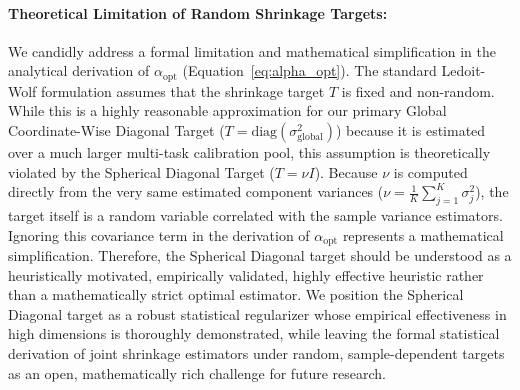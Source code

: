 \paragraph{Theoretical Limitation of Random Shrinkage Targets:} We candidly address a formal limitation and mathematical simplification in the analytical derivation of $\alpha_{\text{opt}}$ (Equation~\ref{eq:alpha_opt}). The standard Ledoit-Wolf formulation assumes that the shrinkage target $T$ is fixed and non-random. While this is a highly reasonable approximation for our primary Global Coordinate-Wise Diagonal Target ($T = \text{diag}(\sigma^2_{\text{global}})$) because it is estimated over a much larger multi-task calibration pool, this assumption is theoretically violated by the Spherical Diagonal Target ($T = \nu I$). Because $\nu$ is computed directly from the very same estimated component variances ($\nu = \frac{1}{K} \sum_{j=1}^K \sigma^2_{j}$), the target itself is a random variable correlated with the sample variance estimators. Ignoring this covariance term in the derivation of $\alpha_{\text{opt}}$ represents a mathematical simplification. Therefore, the Spherical Diagonal target should be understood as a heuristically motivated, empirically validated, highly effective heuristic rather than a mathematically strict optimal estimator. We position the Spherical Diagonal target as a robust statistical regularizer whose empirical effectiveness in high dimensions is thoroughly demonstrated, while leaving the formal statistical derivation of joint shrinkage estimators under random, sample-dependent targets as an open, mathematically rich challenge for future research.


